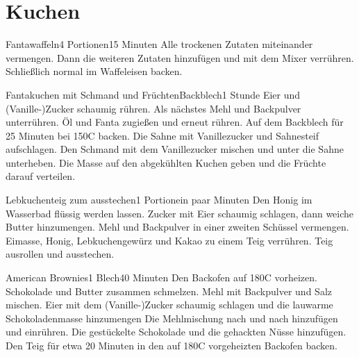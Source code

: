 \documentclass[twoside=true, DIV=16, 11pt,a4paper]{scrreprt}
\begin{document}
	\tableofcontents
	\chapter{Kuchen}
	\begin{recipe}{Fantawaffeln}{4 Portionen}{15 Minuten}
		Alle trockenen Zutaten miteinander vermengen.
		Dann die weiteren Zutaten hinzufügen und mit dem Mixer verrühren.
		\newstep
		Schließlich normal im Waffeleisen backen.
	\end{recipe}\vfill
	\begin{recipe}{Fantakuchen mit Schmand und Früchten}{Backblech}{1 Stunde}
		Eier und (Vanille-)Zucker schaumig rühren.
		Als nächstes Mehl und Backpulver unterrühren.
		Öl und Fanta zugießen und erneut rühren.
		\newstep
		Auf dem Backblech für 25 Minuten bei 150\0C backen.
		Die Sahne mit Vanillezucker und Sahnesteif aufschlagen.
		Den Schmand mit dem Vanillezucker mischen und unter die Sahne unterheben.
		\newstep
		Die Masse auf den abgekühlten Kuchen geben und die Früchte darauf verteilen.
	\end{recipe}
	\clearpage
	\begin{recipe}{Lebkuchenteig zum ausstechen}{1 Portion}{ein paar Minuten}
		Den Honig im Wasserbad flüssig werden lassen.
		Zucker mit Eier schaumig schlagen, dann weiche Butter hinzumengen.
		Mehl und Backpulver in einer zweiten Schüssel vermengen.
		Eimasse, Honig, Lebkuchengewürz und Kakao zu einem Teig verrühren.
		\newstep
		Teig ausrollen und ausstechen.
	\end{recipe}\vfill
	\begin{recipe}{American Brownies}{1 Blech}{40 Minuten}
		Den Backofen auf 180\0C vorheizen.
		\newstep
		Schokolade und Butter zusammen schmelzen.
		Mehl mit Backpulver und Salz mischen.
		Eier mit dem (Vanille-)Zucker schaumig schlagen und die lauwarme Schokoladenmasse hinzumengen
		\newstep
		Die Mehlmischung nach und nach hinzufügen und einrühren.
		Die gestückelte Schokolade und die gehackten Nüsse hinzufügen.
		\newstep
		Den Teig für etwa 20 Minuten in den auf 180\0C vorgeheizten Backofen backen.
	\end{recipe}
\end{document}
